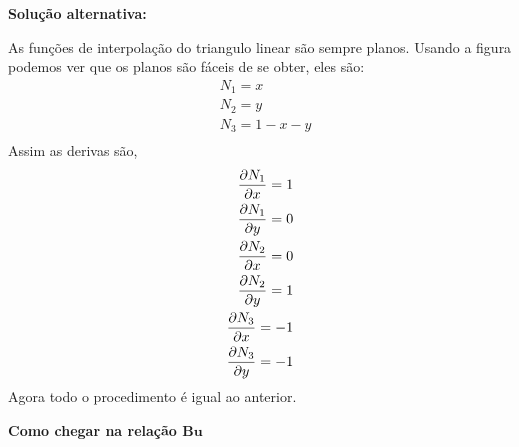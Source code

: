 \textbf{Solução alternativa:}

As funções de interpolação do triangulo linear são sempre planos. Usando a figura podemos ver que os planos são fáceis de se obter, eles são:
%
\begin{equation}
	\begin{split}
		&N_1 = x\\ 
		&N_2 = y\\ 
		&N_3 = 1 - x - y\\ 
	\end{split}
\end{equation}
%
Assim as derivas são,
%
\begin{equation}
	\begin{split}
		\frac{\partial N_1}{\partial x} = 1\\
		\frac{\partial N_1}{\partial y} = 0\\
		\frac{\partial N_2}{\partial x} = 0\\
		\frac{\partial N_2}{\partial y} = 1\\
		\frac{\partial N_3}{\partial x} = -1\\
		\frac{\partial N_3}{\partial y} = -1
	\end{split}
\end{equation}
%
Agora todo o procedimento é igual ao anterior.

\color{red}

\textbf{Como chegar na relação $\mathbf{B}\mathbf{u}$}   

